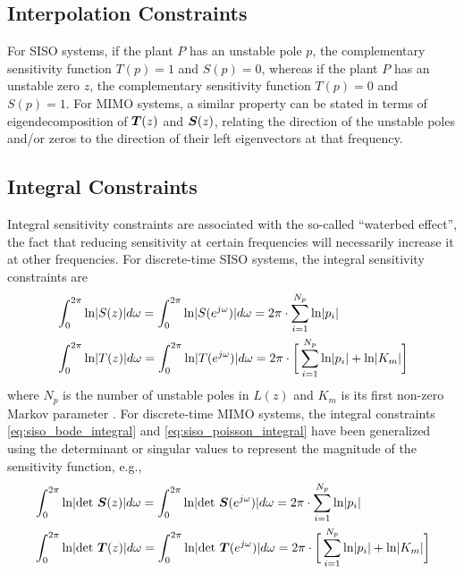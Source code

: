 \subsection{Interpolation Constraints}
For SISO systems, if the plant $P$ has an unstable pole $p$, the complementary sensitivity function $T(p) = 1$ and $S(p) = 0$, whereas if the plant $P$ has an unstable zero $z$, the complementary sensitivity function $T(p) = 0$ and $S(p) = 1$.  For MIMO systems, a similar property can be stated in terms of eigendecomposition of $\vb*{T}(z)$ and $\vb*{S}(z)$, relating the direction of the unstable poles and/or zeros to the direction of their left eigenvectors at that frequency.

\subsection{Integral Constraints}
Integral sensitivity constraints are associated with the so-called ``waterbed effect'', the fact that reducing sensitivity at certain frequencies will necessarily increase it at other frequencies.  For discrete-time SISO systems, the integral sensitivity constraints are
\begin{subequations}
\label{eq:bode_integral_equations_siso}
\begin{align}
	&\int_{0}^{2\pi} \text{ln} |S(z)| d\omega = \int_{0}^{2\pi} \text{ln} |S(e^{j\omega})| d\omega
		= 2\pi \cdot \sum_{i=1}^{N_{p}} \text{ln}|p_{i}| \label{eq:siso_bode_integral}\\
	&\int_{0}^{2\pi} \text{ln} |T(z)| d\omega = \int_{0}^{2\pi} \text{ln} |T(e^{j\omega})| d\omega
		= 2\pi \cdot \bigg{[} \sum_{i=1}^{N_{p}} \text{ln}|p_{i}| + \text{ln}|K_{m}| \bigg{]} \label{eq:siso_poisson_integral}
\end{align}
\end{subequations}
where $N_{p}$ is the number of unstable poles in $L(z)$ and $K_{m}$ is its first non-zero Markov parameter \cite{sung1988properties, sung1989properties, emami2019bode}.  For discrete-time MIMO systems, the integral constraints \eqref{eq:siso_bode_integral} and \eqref{eq:siso_poisson_integral} have been generalized using the determinant \cite{emami2019bode} or singular values \cite{freudenberg1988frequency, hara1989constraints, mohtadi1990bode} to represent the magnitude of the sensitivity function, e.g.,
\begin{subequations}
\label{eq:bode_integral_equations_siso}
\begin{align}
	&\int_{0}^{2\pi} \text{ln} |\text{det } \vb*{S}(z)| d\omega = \int_{0}^{2\pi} \text{ln} |\text{det } \vb*{S}(e^{j\omega})| d\omega
		= 2\pi \cdot \sum_{i=1}^{N_{p}} \text{ln}|p_{i}| \label{eq:siso_bode_integral}\\
	&\int_{0}^{2\pi} \text{ln} |\text{det } \vb*{T}(z)| d\omega = \int_{0}^{2\pi} \text{ln} |\text{det } \vb*{T}(e^{j\omega})| d\omega
		= 2\pi \cdot \bigg{[} \sum_{i=1}^{N_{p}} \text{ln}|p_{i}| + \text{ln}|K_{m}| \bigg{]} \label{eq:siso_poisson_integral}
\end{align}
\end{subequations}

